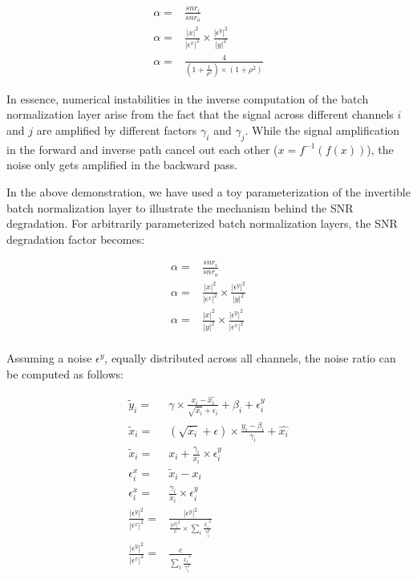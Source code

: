 \documentclass[twocolumn]{bmcart}
\begin{document}
\begin{subequations}
\begin{align}
\alpha =& \frac{snr_i}{snr_o} \\
\alpha =& \frac{|x|^2}{|\epsilon^x|^2} \times  \frac{|\epsilon^y|^2}{|y|^2} \\
\alpha =& \frac{4}{(1+\frac{1}{\rho^2}) \times (1 + \rho^2)}
\end{align}
\end{subequations}

In essence, numerical instabilities in the inverse computation of the batch normalization layer arise
from the fact that the signal across different channels $i$ and $j$ are amplified by different factors $\gamma_i$ and $\gamma_j$.
While the signal amplification in the forward and inverse path cancel out each other ($x=f^{-1}(f(x))$),
the noise only gets amplified in the backward pass.

In the above demonstration, we have used a toy parameterization of the invertible batch normalization layer to illustrate the mechanism behind the SNR degradation. 
For arbitrarily parameterized batch normalization layers, the SNR degradation factor becomes:

\begin{subequations}
\begin{align}
\alpha =& \frac{snr_i}{snr_o} \\
\alpha =& \frac{|x|^2}{|\epsilon^x|^2} \times  \frac{|\epsilon^y|^2}{|y|^2} \\
\alpha =& \frac{|x|^2}{|y|^2} \times  \frac{|\epsilon^y|^2}{|\epsilon^x|^2} \\
\end{align}
\end{subequations}

Assuming a noise $\epsilon^y$, equally distributed across all channels, the noise ratio can be computed as follows:

\begin{subequations}
\begin{align}
\tilde{y}_i  =& \gamma \times \frac{x_i - \hat{x_i}}{\sqrt{\dot{x_i}} + \epsilon_i} + \beta_i + \epsilon^y_i\\
\tilde{x}_i  =& (\sqrt{\dot{x_i}} + \epsilon) \times \frac{y_i -  \beta_i}{\gamma_i}  + \hat{x_i} \\
\tilde{x}_i  =& x_i + \frac{\gamma_i}{\dot{x_i}} \times \epsilon^y_i \\
\epsilon^x_i =& \tilde{x}_i - x_i\\
\epsilon^x_i =& \frac{\gamma_i}{\dot{x_i}} \times \epsilon^y_i\\
\frac{|\epsilon^y|^2}{|\epsilon^x|^2} =& \frac{|\epsilon^y|^2}{\frac{|\epsilon^y|^2}{c} \times \sum_i \frac{\dot{x_i}^2}{\gamma_i^2}} \\
\frac{|\epsilon^y|^2}{|\epsilon^x|^2} =& \frac{c}{\sum_i \frac{\dot{x_i}^2}{\gamma_i^2}}
\end{align}
\end{subequations}
\end{document}
